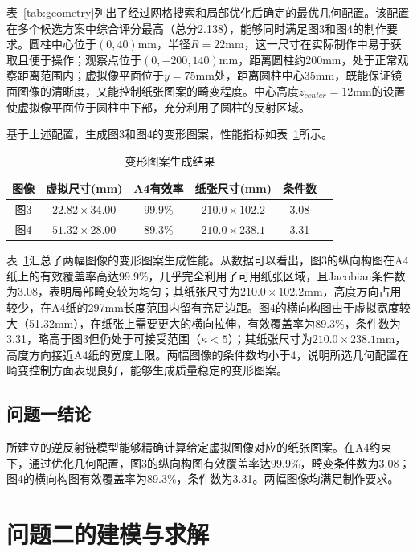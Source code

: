 \documentclass[withoutpreface]{cumcmthesis}
\begin{document}
表~\ref{tab:geometry}列出了经过网格搜索和局部优化后确定的最优几何配置。该配置在多个候选方案中综合评分最高（总分2.138），能够同时满足图3和图4的制作要求。圆柱中心位于$(0,40)$mm，半径$R=22$mm，这一尺寸在实际制作中易于获取且便于操作；观察点位于$(0,-200,140)$mm，距离圆柱约200mm，处于正常观察距离范围内；虚拟像平面位于$y=75$mm处，距离圆柱中心35mm，既能保证镜面图像的清晰度，又能控制纸张图案的畸变程度。中心高度$z_{center}=12$mm的设置使虚拟像平面位于圆柱中下部，充分利用了圆柱的反射区域。

基于上述配置，生成图3和图4的变形图案，性能指标如表~\ref{tab:results}所示。

\begin{table}[H]
\centering
\caption{变形图案生成结果}
\label{tab:results}
\begin{tabular}{cccccc}
\toprule[1.5pt]
\textbf{图像} & \textbf{虚拟尺寸(mm)} & \textbf{A4有效率} & \textbf{纸张尺寸(mm)} & \textbf{条件数} \\
\midrule[1pt]
图3 & $22.82\times34.00$ & 99.9\% & $210.0\times102.2$ & 3.08 \\
图4 & $51.32\times28.00$ & 89.3\% & $210.0\times238.1$ & 3.31 \\
\bottomrule[1.5pt]
\end{tabular}
\end{table}

表~\ref{tab:results}汇总了两幅图像的变形图案生成性能。从数据可以看出，图3的纵向构图在A4纸上的有效覆盖率高达99.9\%，几乎完全利用了可用纸张区域，且Jacobian条件数为3.08，表明局部畸变较为均匀；其纸张尺寸为$210.0\times102.2$mm，高度方向占用较少，在A4纸的297mm长度范围内留有充足边距。图4的横向构图由于虚拟宽度较大（51.32mm），在纸张上需要更大的横向拉伸，有效覆盖率为89.3\%，条件数为3.31，略高于图3但仍处于可接受范围（$\kappa<5$）；其纸张尺寸为$210.0\times238.1$mm，高度方向接近A4纸的宽度上限。两幅图像的条件数均小于4，说明所选几何配置在畸变控制方面表现良好，能够生成质量稳定的变形图案。

\subsection{问题一结论}

所建立的逆反射链模型能够精确计算给定虚拟图像对应的纸张图案。在A4约束下，通过优化几何配置，图3的纵向构图有效覆盖率达99.9\%，畸变条件数为3.08；图4的横向构图有效覆盖率为89.3\%，条件数为3.31。两幅图像均满足制作要求。

\section{问题二的建模与求解}
\end{document}
